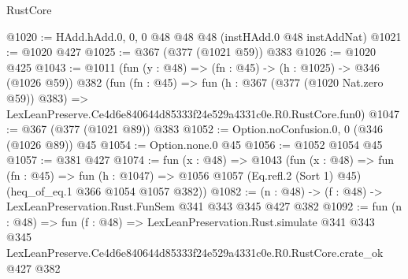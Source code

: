 \begin{lexlean}{RustCore}
\begin{coremodule}
@1020 := HAdd.hAdd.{0, 0, 0} @48 @48 @48 (instHAdd.{0} @48 instAddNat)
@1021 := @1020 @427
@1025 := @367 (@377 (@1021 @59)) @383
@1026 := @1020 @425
@1043 := @1011
    (fun (y : @48) => (fn : @45) -> (h : @1025) -> @346 (@1026 @59))
    @382
    (fun (fn : @45) =>
    fun (h : @367 (@377 (@1020 Nat.zero @59)) @383) =>
    LexLeanPreserve.Ce4d6e840644d85333f24e529a4331c0e.R0.RustCore.fun0)
@1047 := @367 (@377 (@1021 @89)) @383
@1052 := Option.noConfusion.{0, 0} (@346 (@1026 @89)) @45
@1054 := Option.none.{0} @45
@1056 := @1052 @1054 @45
@1057 := @381 @427
@1074 := fun (x : @48) =>
  @1043
    (fun (x : @48) =>
    fun (fn : @45) =>
    fun (h : @1047) => @1056 @1057 (Eq.refl.{2} (Sort 1) @45) (heq_of_eq.{1} @366 @1054 @1057 @382))
@1082 := (n : @48) -> (f : @48) -> LexLeanPreservation.Rust.FunSem @341 @343 @345 @427 @382
@1092 := fun (n : @48) =>
  fun (f : @48) =>
  LexLeanPreservation.Rust.simulate
    @341
    @343
    @345
    LexLeanPreserve.Ce4d6e840644d85333f24e529a4331c0e.R0.RustCore.crate_ok
    @427
    @382
\end{coremodule}
\end{lexlean}
